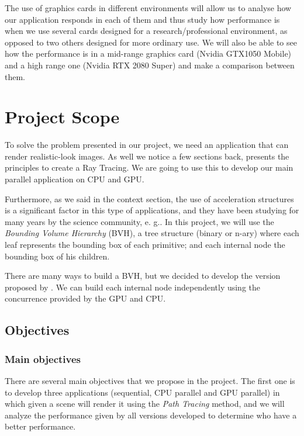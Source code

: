 \documentclass[titlepage,12pt]{report}
\begin{document}
The use of graphics cards in different environments will allow us to analyse how our application responds in each of them and thus study how performance is when we use several cards designed for a research/professional environment, as opposed to two others designed for more ordinary use. We will also be able to see how the performance is in a mid-range graphics card (Nvidia GTX1050 Mobile) and a high range one (Nvidia RTX 2080 Super) and make a comparison between them.

\section{Project Scope}

To solve the problem presented in our project, we need an application that can render realistic-look images. As well we notice a few sections back, \citep{ShirleyRTA, ShirleyRTB, ShirleyRTC} presents the principles to create a Ray Tracing. We are going to use this to develop our main parallel application on CPU and GPU.

Furthermore, as we said in the context section, the use of acceleration structures is a significant factor in this type of applications, and they have been studying for many years by the science community, e. g.\citep{Rubin1980}. In this project, we will use the \textit{
Bounding Volume Hierarchy} (BVH), a tree structure (binary or n-ary) where each leaf represents the bounding box of each primitive; and each internal node the bounding box of his children.

There are many ways to build a BVH, but we decided to develop the version proposed by \citep{Karras2012, Karras2013}. We can build each internal node independently using the concurrence provided by the GPU and CPU.

\subsection{Objectives}

\subsubsection{Main objectives}

There are several main objectives that we propose in the project. The first one is to develop three applications (sequential, CPU parallel and GPU parallel) in which given a scene will render it using the \textit{Path Tracing} method, and we will analyze the performance given by all versions developed to determine who have a better performance.
\end{document}
